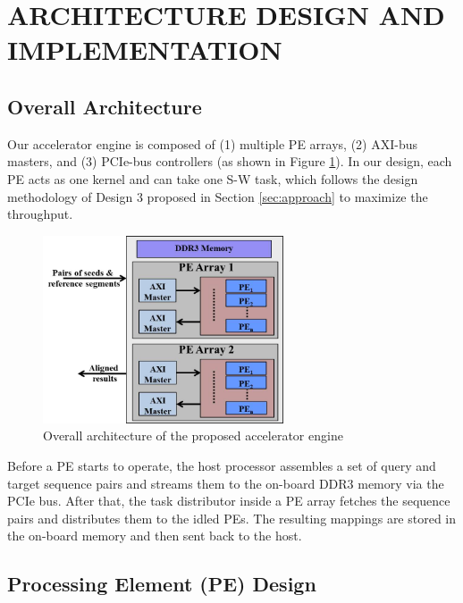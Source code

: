 \section{ARCHITECTURE DESIGN AND IMPLEMENTATION} 
\label{sec:architecture}
\subsection{Overall Architecture}

Our accelerator engine is composed of (1) multiple PE arrays, (2) AXI-bus masters, and (3) PCIe-bus controllers (as shown in Figure \ref{fig:overall_architecture}).
In our design, each PE acts as one kernel and can take one S-W task, 
which follows the design methodology of Design 3 proposed in Section \ref{sec:approach} to maximize the throughput.

\begin{figure}[!hbt]
\begin{center}
\includegraphics[width=2.8in]{Figures/Figure_Arch1.jpg}
\caption {Overall architecture of the proposed accelerator engine} \label{fig:overall_architecture} \end{center} \end{figure}

Before a PE starts to operate, the host processor assembles a set of query and target sequence pairs and streams them to the on-board DDR3 memory via the PCIe bus. 
After that, the task distributor inside a PE array fetches the sequence pairs and distributes them to the idled PEs. 
The resulting mappings are stored in the on-board memory and then sent back to the host.

\subsection{Processing Element (PE) Design}

